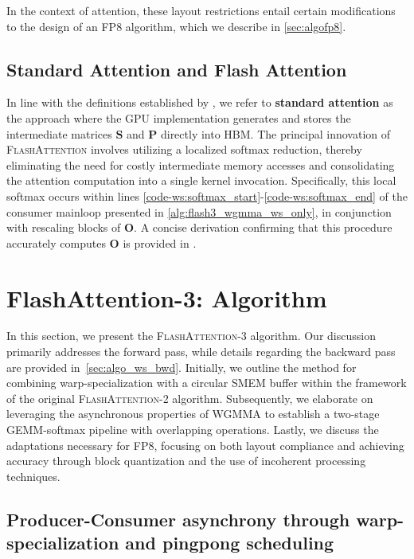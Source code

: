 \begin{enumerate}
In the context of attention, these layout restrictions entail certain modifications to the design of an FP8 algorithm, which we describe in \cref{sec:algofp8}.

\subsection{Standard Attention and Flash Attention} In line with the definitions established by \citet{dao2022flashattention}, we refer to \textbf{standard attention} as the approach where the GPU implementation generates and stores the intermediate matrices $\mathbf{S}$ and $\mathbf{P}$ directly into HBM. The principal innovation of \textsc{FlashAttention} involves utilizing a localized softmax reduction, thereby eliminating the need for costly intermediate memory accesses and consolidating the attention computation into a single kernel invocation. Specifically, this local softmax occurs within lines \ref{code-ws:softmax_start}-\ref{code-ws:softmax_end} of the consumer mainloop presented in \cref{alg:flash3_wgmma_ws_only}, in conjunction with rescaling blocks of $\mathbf{O}$. A concise derivation confirming that this procedure accurately computes $\mathbf{O}$ is provided in \cite[\S 2.3.1]{dao2023flashattention2}.

\section{FlashAttention-3: Algorithm}
\label{sec:algo}

In this section, we present the \textsc{FlashAttention-3} algorithm. Our discussion primarily addresses the forward pass, while details regarding the backward pass are provided in~\cref{sec:algo_ws_bwd}. Initially, we outline the method for combining warp-specialization with a circular SMEM buffer within the framework of the original \textsc{FlashAttention-2} algorithm. Subsequently, we elaborate on leveraging the asynchronous properties of WGMMA to establish a two-stage GEMM-softmax pipeline with overlapping operations. Lastly, we discuss the adaptations necessary for FP8, focusing on both layout compliance and achieving accuracy through block quantization and the use of incoherent processing techniques.

\subsection{Producer-Consumer asynchrony through warp-specialization and pingpong scheduling}
\label{sec:algo_ws}


\end{enumerate}

